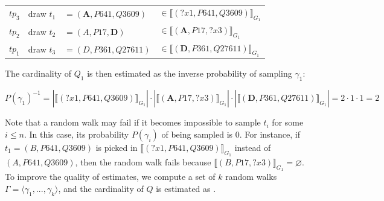 \begin{center}
  \begin{tabular}{l|lll}
    $tp_3$ & draw  $t_1$ &$= (\textbf{A}, P641, Q3609)$ & $\in \llbracket (?x1, P641, Q3609) \rrbracket_{G_1}$ \\
    $tp_2$ & draw  $t_2$ &$= (A, P17, \textbf{D})$ & $ \in \llbracket (\textbf{A}, P17, ?x3) \rrbracket_{G_1}$  \\
    $tp_1$ & draw  $t_3$ &$= (D, P361, Q27611)$ & $\in \llbracket (\textbf{D}, P361, Q27611) \rrbracket_{G_1}$  
  \end{tabular}
\end{center} 

\noindent The cardinality of $Q_1$ is then estimated as the inverse
probability of sampling $\gamma_1$:

\noindent
\begin{small}
$P(\gamma_1)^{-1}  =  |\llbracket (?x1, P641, Q3609) \rrbracket_{G_1}| \cdot
                          |\llbracket (\textbf{A}, P17, ?x3) \rrbracket_{G_1}| \cdot
                          |\llbracket (\textbf{D}, P361,
                          Q27611) \rrbracket_{G_1}| 
                      =  2 \cdot 1 \cdot 1 = 2$
\end{small}


\noindent Note that a random walk may fail if it becomes impossible to sample $t_i$ for
some $i \leq n$. In this case, its probability $P(\gamma_i)$ of being sampled is 0.
For instance, if $t_1 = (B, P641, Q3609)$ is picked in
$\llbracket (?x1, P641, Q3609) \rrbracket_{G_1}$
instead of $(A, P641, Q3609)$, then the random walk fails because
$\llbracket (B, P17, ?x3) \rrbracket_{G_1} = \varnothing$.
%
To improve the quality of estimates, we compute a set of $k$ random
walks $\Gamma = \langle \gamma_1, ..., \gamma_k \rangle$, and the
cardinality of $Q$ is estimated as
.


